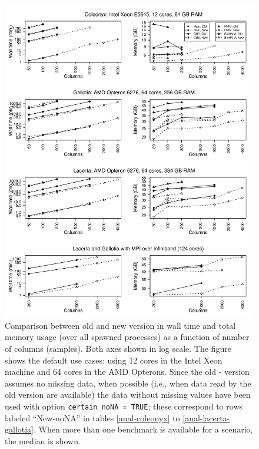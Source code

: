 \documentclass[a4paper,11pt]{article}
\begin{document}
\clearpage
\begin{figure}[h!]
\begin{center}
  \includegraphics[width=16.1cm,keepaspectratio]{anal-benchmark-fig.pdf}
\end{center}
\caption[Wall time and memory usage when analyzing data: version
comparison]{\label{fig-anal} Comparison between old and new version in
  wall time and total memory usage (over all spawned processes) as a
  function of number of columns (samples). Both axes shown in log
  scale. The figure shows the default use cases: using 12 cores in the
  Intel Xeon machine and 64 cores in the AMD Opterons. Since the old -
  version assumes no missing data, when possible (i.e., when data read by
  the old version are available) the data without missing values have been
  used with option \texttt{certain\_noNA = TRUE}; these correspond to rows
  labeled ``New-noNA'' in tables \ref{anal-coleonyx} to
  \ref{anal-lacerta-gallotia}. When more than one benchmark is available
  for a scenario, the median is shown.}
\end{figure}
\end{document}
